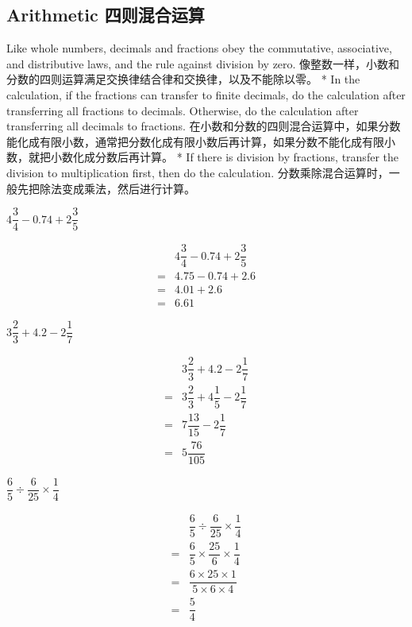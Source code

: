 \subsection{Arithmetic 四则混合运算}

\begin{paracol}{2}
Like whole numbers, decimals and fractions obey the commutative, associative, and distributive laws, and the rule against division by zero.
\switchcolumn[1]
像整数一样，小数和分数的四则运算满足交换律结合律和交换律，以及不能除以零。
\switchcolumn[0]*
In the calculation, if the fractions can transfer to finite decimals, do the calculation after transferring all fractions to decimals. Otherwise, do the calculation after transferring all decimals to fractions. 
\switchcolumn[1]
在小数和分数的四则混合运算中，如果分数能化成有限小数，通常把分数化成有限小数后再计算，如果分数不能化成有限小数，就把小数化成分数后再计算。
\switchcolumn[0]*
If there is division by fractions, transfer the division to multiplication first, then do the calculation.
\switchcolumn[1]
分数乘除混合运算时，一般先把除法变成乘法，然后进行计算。
\end{paracol}

\begin{example}
$4\dfrac{3}{4} - 0.74 + 2\dfrac{3}{5}$
\end{example}
\begin{solution}
\begin{align*}
& 4\dfrac{3}{4} - 0.74 + 2\dfrac{3}{5}\\
= & 4.75 - 0.74 + 2.6\\
= & 4.01 + 2.6\\
= & 6.61
\end{align*}
\end{solution}

\begin{example}
$
3\dfrac{2}{3} + 4.2 -2 \dfrac{1}{7}
$
\end{example}
\begin{solution}
\begin{align*}
&3\dfrac{2}{3} + 4.2 -2 \dfrac{1}{7} \\ 
= & 3\dfrac{2}{3} + 4\dfrac{1}{5} -2 \dfrac{1}{7} \\
= & 7\dfrac{13}{15} -2 \dfrac{1}{7}\\
= & 5\dfrac{76}{105}
\end{align*}
\end{solution}

\begin{example}
$\dfrac{6}{5}\div\dfrac{6}{25}\times \dfrac{1}{4}$
\end{example}
\begin{solution}
\begin{align*}
& \dfrac{6}{5}\div\dfrac{6}{25}\times \dfrac{1}{4}\\
= & \dfrac{6}{5}\times\dfrac{25}{6}\times \dfrac{1}{4}\\
= &  \dfrac{6\times 25\times 1}{5\times 6\times 4}\\
= & \dfrac{5}{4}
\end{align*}
\end{solution}
   \newpage